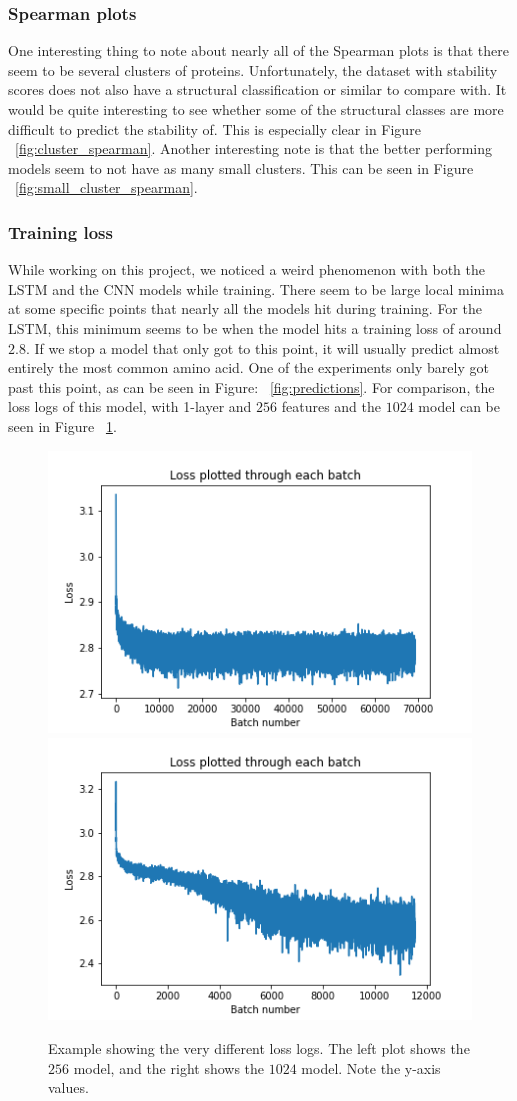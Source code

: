 \subsubsection{Spearman plots}
One interesting thing to note about nearly all of the Spearman plots is that there seem to be several clusters of proteins. Unfortunately, the dataset with stability scores does not also have a structural classification or similar to compare with. It would be quite interesting to see whether some of the structural classes are more difficult to predict the stability of. This is especially clear in Figure ~\ref{fig:cluster_spearman}. Another interesting note is that the better performing models seem to not have as many small clusters. This can be seen in Figure ~\ref{fig:small_cluster_spearman}.

\subsubsection{Training loss}
While working on this project, we noticed a weird phenomenon with both the LSTM and the CNN models while training. There seem to be large local minima at some specific points that nearly all the models hit during training. For the LSTM, this minimum seems to be when the model hits a training loss of around $2.8$. If we stop a model that only got to this point, it will usually predict almost entirely the most common amino acid. One of the experiments only barely got past this point, as can be seen in Figure: ~\ref{fig:predictions}. For comparison, the loss logs of this model, with 1-layer and $256$ features and the $1024$ model can be seen in Figure ~\ref{fig:loss_weird}.

\begin{figure}[!ht]
  \centering
  \includegraphics[width=0.49\linewidth]{latex/imgs/loss_log_1_layer_with_schedule_256.png}
  \includegraphics[width=0.49\linewidth]{latex/imgs/loss_log_1_layer_with_schedule_1024.png}
  \caption{Example showing the very different loss logs. The left plot shows the $256$ model, and the right shows the $1024$ model. Note the y-axis values.}
  \label{fig:loss_weird}
\end{figure}
